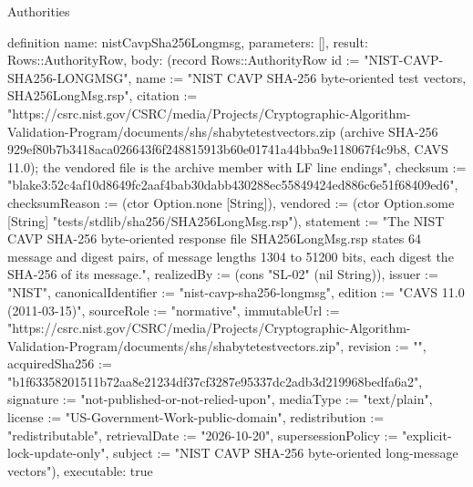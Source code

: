 \begin{lexlean}{Authorities}
\begin{semanticmodule}
definition{
  name: nistCavpSha256Longmsg,
  parameters: [],
  result: Rows::AuthorityRow,
  body: (record Rows::AuthorityRow {id := "NIST-CAVP-SHA256-LONGMSG", name := "NIST CAVP SHA-256 byte-oriented test vectors, SHA256LongMsg.rsp", citation := "https://csrc.nist.gov/CSRC/media/Projects/Cryptographic-Algorithm-Validation-Program/documents/shs/shabytetestvectors.zip (archive SHA-256 929ef80b7b3418aca026643f6f248815913b60e01741a44bba9e118067f4c9b8, CAVS 11.0); the vendored file is the archive member with LF line endings", checksum := "blake3:52c4af10d8649fc2aaf4bab30dabb430288ec55849424ed886c6e51f68409ed6", checksumReason := (ctor Option.none [String]), vendored := (ctor Option.some [String] "tests/stdlib/sha256/SHA256LongMsg.rsp"), statement := "The NIST CAVP SHA-256 byte-oriented response file SHA256LongMsg.rsp states 64 message and digest pairs, of message lengths 1304 to 51200 bits, each digest the SHA-256 of its message.", realizedBy := (cons "SL-02" (nil String)), issuer := "NIST", canonicalIdentifier := "nist-cavp-sha256-longmsg", edition := "CAVS 11.0 (2011-03-15)", sourceRole := "normative", immutableUrl := "https://csrc.nist.gov/CSRC/media/Projects/Cryptographic-Algorithm-Validation-Program/documents/shs/shabytetestvectors.zip", revision := "", acquiredSha256 := "b1f63358201511b72aa8e21234df37cf3287e95337dc2adb3d219968bedfa6a2", signature := "not-published-or-not-relied-upon", mediaType := "text/plain", license := "US-Government-Work-public-domain", redistribution := "redistributable", retrievalDate := "2026-10-20", supersessionPolicy := "explicit-lock-update-only", subject := "NIST CAVP SHA-256 byte-oriented long-message vectors"}),
  executable: true
}


\end{semanticmodule}
\end{lexlean}
